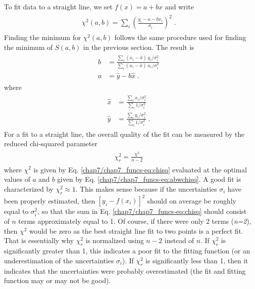 \documentclass[letterpaper,10pt,english]{sphinxmanual}
\begin{document}
To fit data to a straight line, we set $f(x) = a + bx$ and write
\label{chap7/chap7_funcs:equation-eq:chisqlin}\begin{gather}
\begin{split}\chi^2(a,b) = \sum_{i} \left(\frac{y_{i} - a -bx_{i}} {\sigma_{i}}\right)^2 \;.\end{split}\label{chap7/chap7_funcs-eq:chisqlin}
\end{gather}
Finding the minimum for $\chi^2(a,b)$ follows the same procedure used for finding the minimum of $S(a,b)$ in the previous section.  The result is
\label{chap7/chap7_funcs:equation-eq:abwchisq}\begin{gather}
\begin{split}b &= \frac{\sum_{i}(x_{i} - \hat{x})\,y_{i}/\sigma_{i}^2} {\sum_{i}(x_{i} - \hat{x})\,x_{i}/\sigma_{i}^2}\\
a &= \hat{y} - b\hat{x} \;.\end{split}\label{chap7/chap7_funcs-eq:abwchisq}
\end{gather}
where
\label{chap7/chap7_funcs:equation-eq:xychisq}\begin{gather}
\begin{split}\hat{x} &= \frac{\sum_{i}x_{i}/\sigma_{i}^2} {\sum_{i}1/\sigma_{i}^2}\\
\hat{y} &= \frac{\sum_{i}y_{i}/\sigma_{i}^2} {\sum_{i}1/\sigma_{i}^2}\;.\end{split}\label{chap7/chap7_funcs-eq:xychisq}
\end{gather}
For a fit to a straight line, the overall quality of the fit can be measured by the reduced chi-squared parameter
\label{chap7/chap7_funcs:equation-:eq:linreg13}\begin{gather}
\begin{split}\chi_{r}^2 = \frac{\chi^2}{n-2}\end{split}\label{chap7/chap7_funcs-:eq:linreg13}
\end{gather}
where $\chi^2$ is given by Eq. \eqref{chap7/chap7_funcs-eq:chisq} evaluated at the optimal values of $a$ and $b$ given by Eq. \eqref{chap7/chap7_funcs-eq:abwchisq}.  A good fit is characterized by $\chi_{r}^2 \approx 1$.  This makes sense because if the uncertainties $\sigma_{i}$ have been properly estimated, then $[y_{i}-f(x_{i})]^2$ should on average be roughly equal to $\sigma_{i}^2$, so that the sum in Eq. \eqref{chap7/chap7_funcs-eq:chisq} should consist of $n$ terms approximately equal to 1.  Of course, if there were only 2 terms (\emph{n=2}), then $\chi^2$ would be zero as the best straight line fit to two points is a perfect fit.  That is essentially why $\chi_{r}^2$ is normalized using $n-2$ instead of $n$.  If $\chi_{r}^2$ is significantly greater than 1, this indicates a poor fit to the fitting function (or an underestimation of the uncertainties $\sigma_{i}$).  If $\chi_{r}^2$ is significantly less than 1, then it indicates that the uncertainties were probably overestimated (the fit and fitting function may or may not be good).
\end{document}

